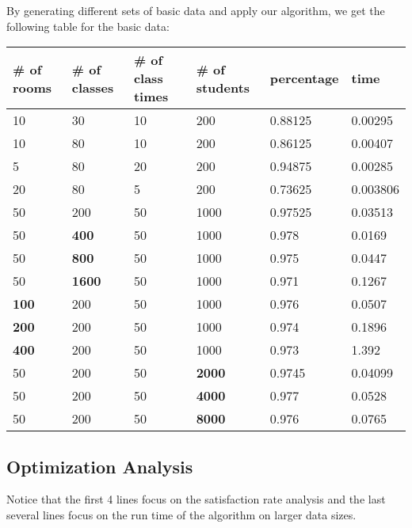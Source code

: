 \documentclass[11pt, oneside]{article}   	%
\begin{document}
By generating different sets of basic data and apply our algorithm, we get the following table for the basic data:
\begin{table}[h]
\begin{tabular}{|l|l|l|l|l|l|}
\hline
\# of rooms & \# of classes & \# of class times & \# of students & percentage & time     \\ \hline
10          & 30            & 10                & 200            & 0.88125    & 0.00295  \\ \hline
10          & 80            & 10                & 200            & 0.86125    & 0.00407  \\ \hline
5           & 80            & 20                & 200            & 0.94875    & 0.00285  \\ \hline
20          & 80            & 5                 & 200            & 0.73625    & 0.003806 \\ \hline
\hline
50          & 200           & 50                & 1000           & 0.97525    & 0.03513  \\ \hline
\hline
50          & \textbf{400}           & 50                & 1000           & 0.978    & 0.0169  \\ \hline
50          & \textbf{800}           & 50                & 1000           & 0.975    & 0.0447  \\ \hline
50          & \textbf{1600}           & 50                & 1000           & 0.971    & 0.1267  \\ \hline
\textbf{100}          & 200           & 50                & 1000           & 0.976    & 0.0507  \\ \hline
\textbf{200}          & 200           & 50                & 1000           & 0.974    & 0.1896  \\ \hline
\textbf{400}          & 200           & 50                & 1000           & 0.973    & 1.392  \\ \hline
50          & 200           & 50                & \textbf{2000}           & 0.9745    & 0.04099  \\ \hline
50          & 200           & 50                & \textbf{4000}           & 0.977    & 0.0528  \\ \hline
50          & 200           & 50                & \textbf{8000}           & 0.976    & 0.0765  \\ \hline
\end{tabular}
\end{table}
\subsection{Optimization Analysis}
Notice that the first 4 lines focus on the satisfaction rate analysis and the last several lines focus on the run time of the algorithm on larger data sizes.
\end{document}
